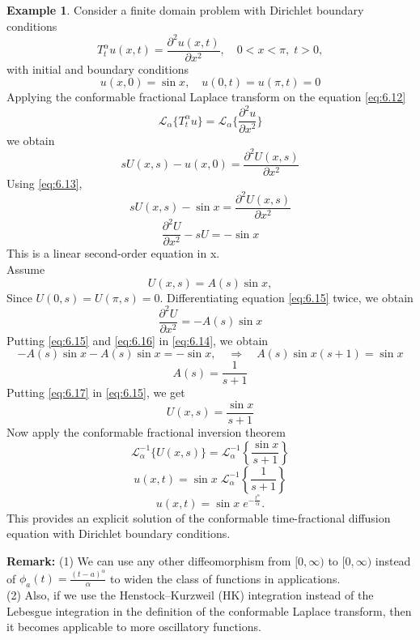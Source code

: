 \documentclass[two side,reqno,12pt]{amsart}
\numberwithin{equation}{section}
\theoremstyle{definition}
\newtheorem{example}[lemma]{Example}
\begin{document}
\begin{example}
    Consider a finite domain problem with Dirichlet boundary conditions
\begin{equation}
    T_t^\alpha u(x,t) = \frac{\partial^2 u(x,t)}{\partial x^2}, \quad 0 < x < \pi,\; t > 0, 
    \label{eq:6.12}
    \end{equation}
with initial and boundary conditions
\begin{equation}
    u(x,0) = \sin x, \quad u(0,t) = u(\pi,t) = 0
    \label{eq:6.13}
\end{equation}
Applying the conformable fractional Laplace transform on the equation \eqref{eq:6.12} 
\[
    \mathcal{L}_{\alpha}\{T_t^\alpha u\} = \mathcal{L}_{\alpha}\{\frac{\partial^2 u}{\partial x^2}\}
\]
we obtain
\[
    sU(x,s) - u(x,0)=\frac{\partial^2 U(x,s)}{\partial x^2}
\]
Using \eqref{eq:6.13},
\[
    sU(x,s) - \sin x = \frac{\partial^2 U(x,s)}{\partial x^2} 
\]
\begin{equation}
    \frac{\partial^2 U}{\partial x^2}- sU = - \sin x
    \label{eq:6.14}
\end{equation}
This is a linear second-order equation in x. \\
Assume
\begin{equation}
    U(x,s) = A(s)\sin x,
    \label{eq:6.15}
\end{equation}
Since
\(
U(0,s) = U(\pi,s) = 0
\).
Differentiating equation \eqref{eq:6.15} twice, we obtain
\begin{equation}
    \frac{\partial^2 U}{\partial x^2}= - A(s)\sin x
    \label{eq:6.16}
\end{equation}
Putting \eqref{eq:6.15} and \eqref{eq:6.16} in \eqref{eq:6.14}, we obtain
\[
- A(s)\sin x- A(s)\sin x = - \sin x, \quad \Rightarrow \quad A(s)\sin x(s+1) = \sin x
\]
\begin{equation}
    A(s) = \frac{1}{s + 1}
    \label{eq:6.17}
\end{equation}
Putting \eqref{eq:6.17} in \eqref{eq:6.15}, we get 
\[
    U(x,s) = \frac{\sin x}{s + 1}
\]
Now apply the conformable fractional inversion theorem 
\[
    \mathcal{L}_{\alpha}^{-1}\{U(x,s)\}= \mathcal{L}_{\alpha}^{-1}\!\left\{\frac{\sin x}{s+1}\right\}
\]
\[
    u(x,t) = \sin x \; \mathcal{L}^{-1}_{\alpha}\!\left\{\frac{1}{s+1}\right\}
\]
\[
    u(x,t) = \sin x \; e^{-\frac{t^{\alpha}}{\alpha}}.
\]
This provides an explicit solution of the conformable time-fractional diffusion equation with Dirichlet boundary conditions.
\end{example}
\textbf{Remark:}
(1)  We can use any other diffeomorphism from $[0,\infty)$ to $[0,\infty)$ instead of 
$\phi_a(t)=\frac{(t-a)^\alpha}{\alpha}$ to widen the class of functions in applications.\\
(2) Also, if we use the Henstock--Kurzweil (HK) integration instead of the Lebesgue 
integration in the definition of the conformable Laplace transform, then it becomes 
applicable to more oscillatory functions.
\end{document}

